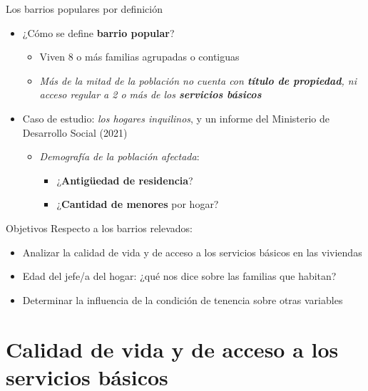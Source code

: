 \documentclass[aspectratio=169]{beamer}
\begin{document}
    \begin{frame}{Los barrios populares por definición}
        \setlength{\leftmargini}{8pt}
        \begin{itemize}
            \item<2-> ¿Cómo se define \textbf{barrio popular}? 
                \begin{itemize}
                    \item<3-> Viven 8 o más familias agrupadas o contiguas
                    \item<4-> \textit{Más de la mitad de la población no cuenta con \textbf{título de propiedad}, ni acceso regular a 2 o más de los \textbf{servicios básicos}}
                \end{itemize}
            \item<5-> Caso de estudio: \textit{los hogares inquilinos}, y un informe del Ministerio de Desarrollo Social (2021)
                \begin{itemize}
                    \item<6-> \textit{Demografía de la población afectada}:
                        \begin{itemize}
                            \item<7-> ¿\textbf{Antigüedad de residencia}?
                            \item<8-> ¿\textbf{Cantidad de menores} por hogar?
                        \end{itemize}
                \end{itemize}
        \end{itemize}
    \end{frame}

    \begin{frame}{Objetivos}
        Respecto a los barrios relevados:
        \begin{itemize}
            \item<2-> Analizar la calidad de vida y de acceso a los servicios básicos en las viviendas
            \item<3-> Edad del jefe/a del hogar: ¿qué nos dice sobre las familias que habitan?
            \item<4-> Determinar la influencia de la condición de tenencia sobre otras variables
        \end{itemize}
    \end{frame}
    
    \section{Calidad de vida y de acceso a los servicios básicos}
    \begin{frame}
        \tableofcontents[currentsection]
    \end{frame} %
\end{document}
